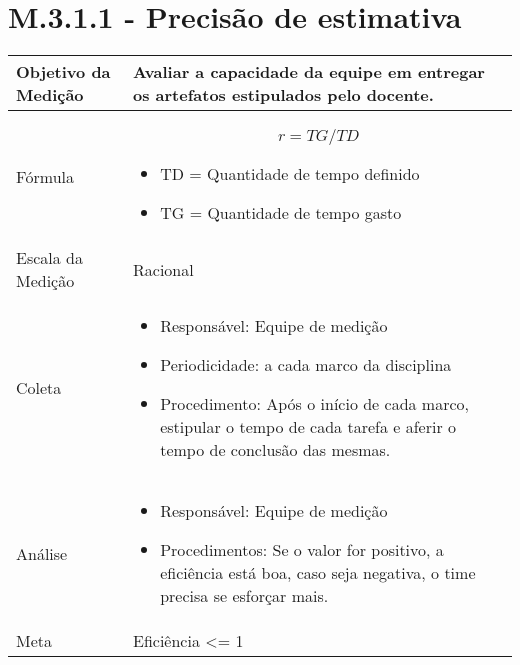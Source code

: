 \section{M.3.1.1 - Precisão de estimativa} %

	\begin{tabular}{ |p{4cm}|p{8cm}|  }
	 \hline
	 Objetivo da Medição 		&  	 Avaliar a capacidade da equipe em entregar os artefatos estipulados pelo docente.  \\ %
	 \hline
	 Fórmula		& 	 \[ r = TG / TD \]	\begin{itemize} \item TD = Quantidade de tempo definido \item TG = Quantidade de tempo gasto \end{itemize}\\
	 \hline
	 Escala da Medição 		& 	Racional	 \\
	 \hline
	 Coleta		& 	\begin{itemize} \item Responsável: Equipe de medição \item Periodicidade: a cada marco da disciplina \item Procedimento: Após o início de cada marco, estipular o tempo de cada tarefa e aferir o tempo de conclusão das mesmas. \end{itemize}	\\
	 \hline
	 Análise		& 	\begin{itemize} \item Responsável: Equipe de medição \item Procedimentos: Se o valor for positivo, a eficiência está boa, caso seja negativa, o time precisa se esforçar mais. \end{itemize} \\
	 \hline
	 Meta		& 	Eficiência <= 1	 \\
	 \hline
	\end{tabular}



